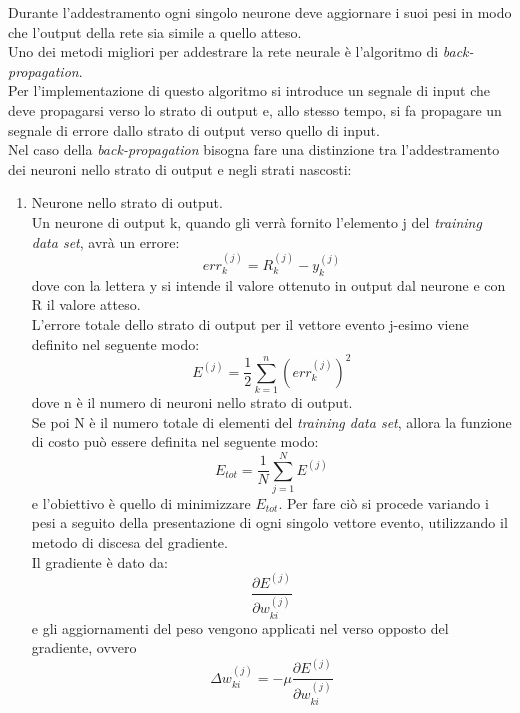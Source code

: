 Durante l'addestramento ogni singolo neurone deve aggiornare i suoi pesi in modo che l'output della rete sia simile a quello atteso. \\
Uno dei metodi migliori per addestrare la rete neurale è l'algoritmo di \textit{back-propagation}. \\
Per l'implementazione di questo algoritmo si introduce un segnale di input che deve propagarsi verso lo strato di output e, allo stesso tempo, si fa propagare un segnale di errore dallo strato di output verso quello di input.\\
Nel caso della \textit{back-propagation} bisogna fare una distinzione tra l'addestramento dei neuroni nello strato di output e negli strati nascosti:
\begin{enumerate}
	\item Neurone nello strato di output.\\
	Un neurone di output k, quando gli verrà fornito l'elemento j del \textit{training data set}, avrà un errore:
	\begin{equation}
	err_k^{(j)} = R_k^{(j)} - y_k^{(j)}
	\end{equation}
	dove con la lettera y si intende il valore ottenuto in output dal neurone e con R il valore atteso. \\
	L'errore totale dello strato di output per il vettore evento j-esimo viene definito nel seguente modo:
	\begin{equation}
	E^{(j)} = \frac{1}{2} \sum_{k=1}^{n} (err_k^{(j)})^2
	\end{equation}
	dove n è il numero di neuroni nello strato di output. \\
	Se poi N è il numero totale di elementi del \textit{training data set}, allora la funzione di costo può essere definita nel seguente modo:
	\begin{equation}
	E_{tot} = \frac{1}{N}\sum_{j=1}^{N} E^{(j)}
	\end{equation}
	e l'obiettivo è quello di minimizzare $E_{tot}$. Per fare ciò si procede variando i pesi a seguito della presentazione di ogni singolo vettore evento, utilizzando il metodo di discesa del gradiente.\\ 
	Il gradiente è dato da:
	\begin{equation}
	\frac{\partial E^{(j)} }{\partial w_{ki}^{(j)}}
	\end{equation}
	e gli aggiornamenti del peso vengono applicati nel verso opposto del gradiente, ovvero
	\begin{equation}
	\Delta w_{ki}^{(j)} = -\mu \frac{\partial E^{(j)} }{\partial w_{ki}^{(j)}}

\end{equation}
\end{enumerate}
